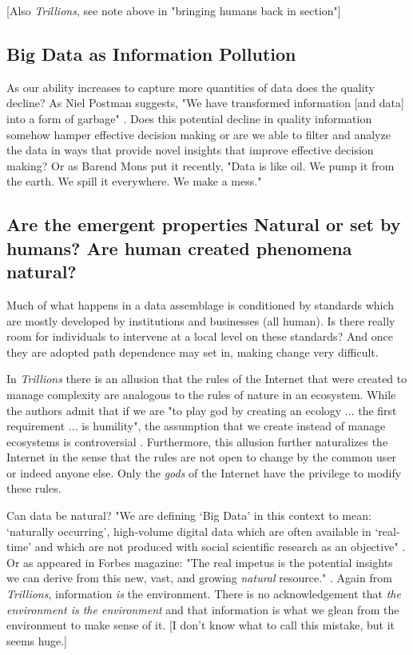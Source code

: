 [Also \textit{Trillions}, see note above in "bringing humans back in section"]

\subsection{Big Data as Information Pollution}

As our ability increases to capture more quantities of data does the quality decline? As Niel Postman suggests, "We have transformed information [and data] into a form of garbage" \citep[cited in][p. 50]{stepp_1999}. Does this potential decline in quality information somehow hamper effective decision making or are we able to filter and analyze the data in ways that provide novel insights that improve effective decision making? Or as Barend Mons put it recently, "Data is like oil. We pump it from the earth. We spill it everywhere. We make a mess." \citep{mons_2016}

\subsection{Are the emergent properties Natural or set by humans? Are human created phenomena natural?}

Much of what happens in a data assemblage is conditioned by standards which are mostly developed by institutions and businesses (all human). Is there really room for individuals to intervene at a local level on these standards? And once they are adopted path dependence may set in, making change very difficult. 

In \textit{Trillions} there is an allusion that the rules of the Internet that were created to manage complexity are analogous to the rules of nature in an ecosystem. While the authors admit that if we are "to play god by creating an ecology ... the first requirement ... is humility", the assumption that we create instead of manage ecosystems is controversial \citep[][p. 140]{lucas_2012}. Furthermore, this allusion further naturalizes the Internet in the sense that the rules are not open to change by the common user or indeed anyone else. Only the \textit{gods} of the Internet have the privilege to modify these rules.

Can data be natural? "We are defining ‘Big Data’ in this context to mean: ‘naturally occurring’, high-volume digital data which are often available in ‘real-time’ and which are not produced with social scientific research as an objective" \citep{ncrm_2015}. Or as appeared in Forbes magazine: "The real impetus is the potential insights we can derive from this new, vast, and growing \textit{natural} resource." \citep[][emphasis ours]{rotella_2012}. Again from \textit{Trillions}, information \textit{is} the environment. There is no acknowledgement that \textit{the environment is the environment} and that information is what we glean from the environment to make sense of it. [I don't know what to call this mistake, but it seems huge.]

